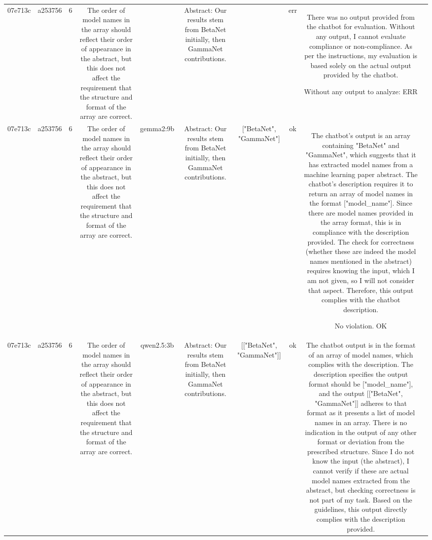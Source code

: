 \begin{table}[h!]
\begin{tabular}{|c|c|c|c|c|c|c|c|c|c|}
\[\[\[These factors led me to conclude that the output violates the description:

1. The response is missing the required format of an array with model names or `["NA"]`, violating the output specifications.
2. The response includes information about how to extract model names, which is not required by the current task description.

ERR & \\
\hline
07e713c & a253756 & 6 & The order of model names in the array should reflect their order of appearance in the abstract, but this does not affect the requirement that the structure and format of the array are correct. &  & Abstract: Our results stem from BetaNet initially, then GammaNet contributions. &  & err & There was no output provided from the chatbot for evaluation. Without any output, I cannot evaluate compliance or non-compliance. As per the instructions, my evaluation is based solely on the actual output provided by the chatbot.

Without any output to analyze:
ERR & \\
\hline
07e713c & a253756 & 6 & The order of model names in the array should reflect their order of appearance in the abstract, but this does not affect the requirement that the structure and format of the array are correct. & gemma2:9b & Abstract: Our results stem from BetaNet initially, then GammaNet contributions. & ["BetaNet", "GammaNet"] 
 & ok & The chatbot's output is an array containing "BetaNet" and "GammaNet", which suggests that it has extracted model names from a machine learning paper abstract. The chatbot's description requires it to return an array of model names in the format ["model_name"]. Since there are model names provided in the array format, this is in compliance with the description provided. The check for correctness (whether these are indeed the model names mentioned in the abstract) requires knowing the input, which I am not given, so I will not consider that aspect. Therefore, this output complies with the chatbot description.

No violation.
OK & \\
\hline
07e713c & a253756 & 6 & The order of model names in the array should reflect their order of appearance in the abstract, but this does not affect the requirement that the structure and format of the array are correct. & qwen2.5:3b & Abstract: Our results stem from BetaNet initially, then GammaNet contributions. & [["BetaNet", "GammaNet"]] & ok & The chatbot output is in the format of an array of model names, which complies with the description. The description specifies the output format should be ["model_name"], and the output [["BetaNet", "GammaNet"]] adheres to that format as it presents a list of model names in an array. There is no indication in the output of any other format or deviation from the prescribed structure. Since I do not know the input (the abstract), I cannot verify if these are actual model names extracted from the abstract, but checking correctness is not part of my task. Based on the guidelines, this output directly complies with the description provided.

\]\]\]
\end{tabular}
\end{table}
